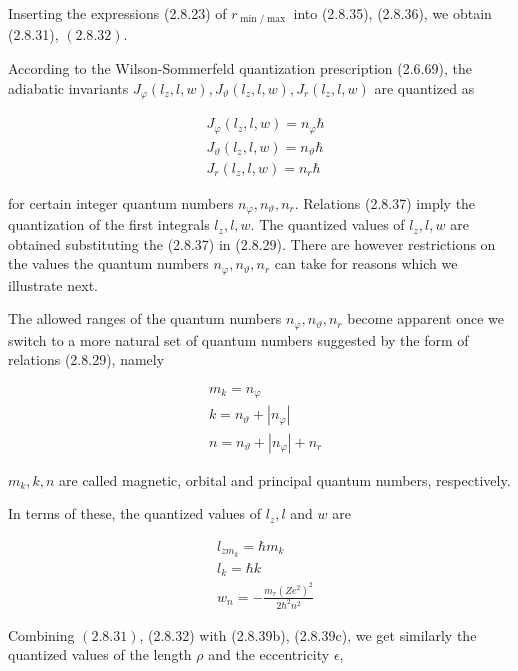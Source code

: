 \documentclass{article}
\begin{document}
Inserting the expressions (2.8.23) of $r_{\min / \max }$ into (2.8.35), (2.8.36), we obtain (2.8.31), $(2.8 .32)$.

According to the Wilson-Sommerfeld quantization prescription (2.6.69), the adiabatic invariants $J_{\varphi}\left(l_{z}, l, w\right), J_{\vartheta}\left(l_{z}, l, w\right), J_{r}\left(l_{z}, l, w\right)$ are quantized as
 
\begin{align*}
& J_{\varphi}\left(l_{z}, l, w\right)=n_{\varphi} \hbar  \tag{2.8.37a}\\
& J_{\vartheta}\left(l_{z}, l, w\right)=n_{\vartheta} \hbar  \tag{2.8.37b}\\
& J_{r}\left(l_{z}, l, w\right)=n_{r} \hbar \tag{2.8.37c}
\end{align*}
 
for certain integer quantum numbers $n_{\varphi}, n_{\vartheta}, n_{r}$.
Relations (2.8.37) imply the quantization of the first integrals $l_{z}, l, w$. The quantized values of $l_{z}, l, w$ are obtained substituting the (2.8.37) in (2.8.29). There are however restrictions on the values the quantum numbers $n_{\varphi}, n_{\vartheta}, n_{r}$ can take for reasons which we illustrate next.

The allowed ranges of the quantum numbers $n_{\varphi}, n_{\vartheta}, n_{r}$ become apparent once we switch to a more natural set of quantum numbers suggested by the form of relations (2.8.29), namely
 
\begin{align*}
& m_{k}=n_{\varphi}  \tag{2.8.38a}\\
& k=n_{\vartheta}+\left|n_{\varphi}\right|  \tag{2.8.38b}\\
& n=n_{\vartheta}+\left|n_{\varphi}\right|+n_{r} \tag{2.8.38c}
\end{align*}
 
$m_{k}, k, n$ are called magnetic, orbital and principal quantum numbers, respectively.

In terms of these, the quantized values of $l_{z}, l$ and $w$ are
 
\begin{align*}
& l_{z m_{k}}=\hbar m_{k}  \tag{2.8.39a}\\
& l_{k}=\hbar k  \tag{2.8.39b}\\
& w_{n}=-\frac{m_{r}\left(Z e^{2}\right)^{2}}{2 \hbar^{2} n^{2}} \tag{2.8.39c}
\end{align*}
 

Combining $(2.8 .31)$, (2.8.32) with (2.8.39b), (2.8.39c), we get similarly the quantized values of the length $\rho$ and the eccentricity $\epsilon$,
 
\end{document}
